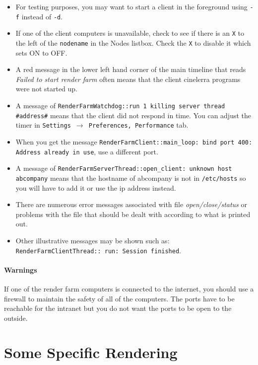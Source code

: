 \begin{itemize}
    \item For testing purposes, you may want to start a client in the foreground using \texttt{-f} instead of \texttt{-d}.
    \item If one of the client computers is unavailable, check to see if there is an \texttt{X} to the left of the \texttt{nodename}
    in the Nodes listbox.  Check the \texttt{X} to disable it which sets ON to OFF.
    \item A red message in the lower left hand corner of the main timeline that reads \textit{Failed to start render
    farm} often means that the client cinelerra programs were not started up.
    \item A message of \texttt{RenderFarmWatchdog::run 1 killing server thread \\ \#address\#} means that the client did
    not respond in time.  You can adjust the timer in \texttt{Settings $\rightarrow$ Preferences, Performance} tab.
    \item When you get the message \texttt{RenderFarmClient::main\_loop: bind port 400: Address already in use}, use a different port.
    \item A message of \texttt{RenderFarmServerThread::open\_client: unknown host abcompany} means that the
    hostname of abcompany is not in \texttt{/etc/hosts} so you will have to add it or use the ip address instead.
    \item There are numerous error messages associated with file \textit{open/close/status} or problems with the file
    that should be dealt with according to what is printed out.
    \item Other illustrative messages may be shown such as: \texttt{RenderFarmClientThread:: run: Session finished}.
\end{itemize}

\paragraph{Warnings}

If one of the render farm computers is connected to the internet, you should use a firewall to maintain the safety of all of the computers.  The ports have to be reachable for the intranet but you do not want the ports to be open to the outside.

\section{Some Specific Rendering}%
\label{sec:some_specific_rendering}


